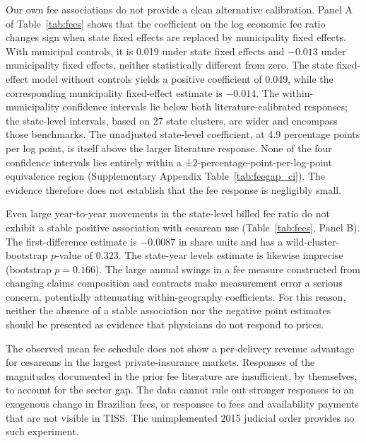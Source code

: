 \documentclass[12pt]{article}
\newcommand{\satab}[1]{Supplementary Appendix Table~\ref{#1}}
\begin{document}
Our own fee associations do not provide a clean alternative calibration. Panel A of Table~\ref{tab:fees} shows that the coefficient on the log economic fee ratio changes sign when state fixed effects are replaced by municipality fixed effects. With municipal controls, it is 0.019 under state fixed effects and $-0.013$ under municipality fixed effects, neither statistically different from zero. The state fixed-effect model without controls yields a positive coefficient of 0.049, while the corresponding municipality fixed-effect estimate is $-0.014$. The within-municipality confidence intervals lie below both literature-calibrated responses; the state-level intervals, based on 27 state clusters, are wider and encompass those benchmarks. The unadjusted state-level coefficient, at 4.9 percentage points per log point, is itself above the larger literature response. None of the four confidence intervals lies entirely within a ±2-percentage-point-per-log-point equivalence region (\satab{tab:feegap_ci}). The evidence therefore does not establish that the fee response is negligibly small.

Even large year-to-year movements in the state-level billed fee ratio do not exhibit a stable positive association with cesarean use (Table~\ref{tab:fees}, Panel B). The first-difference estimate is $-0.0087$ in share units and has a wild-cluster-bootstrap $p$-value of 0.323. The state-year levels estimate is likewise imprecise (bootstrap $p = 0.166$). The large annual swings in a fee measure constructed from changing claims composition and contracts make measurement error a serious concern, potentially attenuating within-geography coefficients. For this reason, neither the absence of a stable association nor the negative point estimates should be presented as evidence that physicians do not respond to prices.

The observed mean fee schedule does not show a per-delivery revenue advantage for cesareans in the largest private-insurance markets. Responses of the magnitudes documented in the prior fee literature are insufficient, by themselves, to account for the sector gap. The data cannot rule out stronger responses to an exogenous change in Brazilian fees, or responses to fees and availability payments that are not visible in TISS. The unimplemented 2015 judicial order provides no such experiment.



\end{document}
